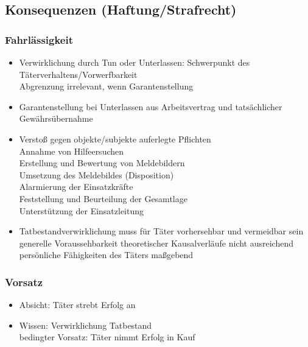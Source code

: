 \subsection{Konsequenzen (Haftung/Strafrecht)}
\begin{normbox}{\subsubsection{Fahrlässigkeit}}
    \begin{itemize}
        \item Verwirklichung durch Tun oder Unterlassen: Schwerpunkt des Täterverhaltens/Vorwerfbarkeit\\
        \ra Abgrenzung irrelevant, wenn Garantenstellung 
        \item Garantenstellung bei Unterlassen aus Arbeitsvertrag und tatsächlicher Gewährsübernahme
        \item Verstoß gegen objekte/subjekte auferlegte Pflichten\\
        \ra Annahme von Hilfeersuchen\\
        \ra Erstellung und Bewertung von Meldebildern\\
        \ra Umsetzung des Meldebildes (Disposition)\\
        \ra Alarmierung der Einsatzkräfte\\
        \ra Feststellung und Beurteilung der Gesamtlage\\
        \ra Unterstützung der Einsatzleitung
        \item Tatbestandverwirklichung muss für Täter vorhersehbar und vermeidbar sein\\
        \ra generelle Voraussehbarkeit theoretischer Kausalverläufe nicht ausreichend\\
        \ra persönliche Fähigkeiten des Täters maßgebend
    \end{itemize}
\end{normbox}
\begin{normbox}{\subsubsection{Vorsatz}}
    \begin{itemize}
        \item Absicht: Täter strebt Erfolg an
        \item Wissen: Verwirklichung Tatbestand\\
        \ra bedingter Vorsatz: Täter nimmt Erfolg in Kauf
    \end{itemize}
\end{normbox}
